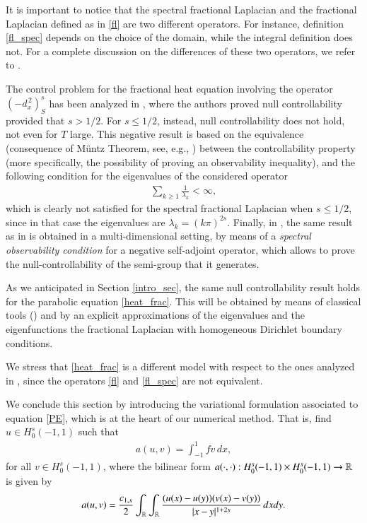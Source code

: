 It is important to notice that the spectral fractional Laplacian and the fractional Laplacian defined as in \eqref{fl} are two different operators. For instance, definition \eqref{fl_spec} depends on the choice of the domain, while the integral definition does not. For a complete discussion on the differences of these two operators, we refer to \cite{servadei2014spectrum}.

The control problem for the fractional heat equation involving the operator $(-d_x^{\,2})^s_S$ has been analyzed in \cite{micu2006controllability}, where the authors proved null controllability provided that $s>1/2$. For $s\leq 1/2$, instead, null controllability does not hold, not even for $T$ large. This negative result is based on the equivalence (consequence of M\"untz Theorem, see, e.g., \cite[Page 24]{schwartz1958etude}) between the controllability property (more specifically, the possibility of proving an observability inequality), and the following condition for the eigenvalues of the considered operator 
\begin{align}\label{eigen_cond}
	\sum_{k\geq 1} \frac{1}{\lambda_k}<\infty,
\end{align} 
which is clearly not satisfied for the spectral fractional Laplacian when $s\leq 1/2$, since in that case the eigenvalues are $\lambda_k = (k\pi)^{2s}$. Finally, in \cite{miller2006controllability}, the same result as in \cite{micu2006controllability} is obtained in a multi-dimensional setting, by means of a  \textit{spectral observability condition} for a negative self-adjoint operator, which allows to prove the null-controllability of the semi-group that it generates.

As we anticipated in Section \ref{intro_sec}, the same null controllability result holds for the parabolic equation \eqref{heat_frac}.
This will be obtained by means of classical tools (\cite{fattorini1971exact}) and by an explicit approximations of the eigenvalues and the eigenfunctions the fractional Laplacian with homogeneous Dirichlet boundary conditions. 

We stress that \eqref{heat_frac} is a different model with respect to the ones analyzed in \cite{micu2004introduction,miller2006controllability}, since the operators \eqref{fl} and \eqref{fl_spec} are not equivalent. 

We conclude this section by introducing the variational formulation associated to equation \eqref{PE}, which is at the heart of our numerical method. That is, find $u\in H^s_0(-1,1)$ such that
\begin{align*}
a(u,v) = \int_{-1}^1 fv\,dx,	
\end{align*}
for all $v\in H_0^s(-1,1)$, where the bilinear form $a(\cdot,\cdot):H^s_0(-1,1)\times H^s_0(-1,1)\to \mathbb{R}$ is given by
\begin{align}\label{bilinear}
a(u,v)=\frac{c_{1,s}}{2} \int_{\mathbb{R}}\int_{\mathbb{R}}\frac{(u(x)-u(y))(v(x)-v(y))}{|x-y|^{1+2s}}\,dxdy.	
\end{align}

